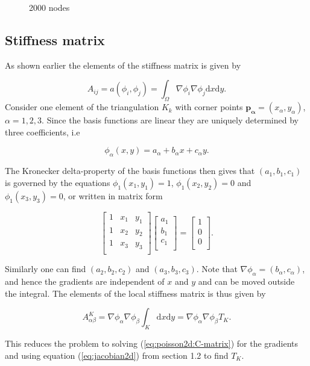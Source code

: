 \documentclass[paper=a4, fontsize=11pt]{scrartcl} %
\begin{document}
\begin{figure}[!htb]
  \caption{2000 nodes}\label{fig:2d2000}
\endminipage
\end{figure}

\subsection{Stiffness matrix}
As shown earlier the elements of the stiffness matrix is given by

\[ A_{ij} = a(\phi_i,\phi_j)=\int_{\Omega} \nabla \phi_i \nabla \phi_j \mathrm{d}x\mathrm{d}y.\] 
Consider one element of the triangulation $K_k$ with corner points $\mathbf{p_\alpha}=(x_\alpha,y_\alpha)$, $\alpha=1,2,3$. Since the basis functions are linear they are uniquely determined by three coefficients, i.e

\[\phi_\alpha(x,y) = a_\alpha +b_\alpha x+c_\alpha y.\]

The Kronecker delta-property of the basis functions then gives that $(a_1, b_1,c_1)$ is governed by the equations $\phi_1(x_1,y_1)=1$, $\phi_1(x_2,y_2)=0$ and $\phi_1(x_3,y_3)=0$, or written in matrix form

\begin{equation}
\begin{bmatrix}
  1 & x_1 & y_1\\
  1 & x_2 & y_2\\
  1 & x_3 & y_3\\\end{bmatrix}
\begin{bmatrix} a_1 \\ b_1\\ c_1 \\ \end{bmatrix} =
\begin{bmatrix}
  1 \\ 0\\ 0 \\
\end{bmatrix}.
\label{eq:poisson2d:C-matrix}
\end{equation}

Similarly one can find $(a_2, b_2,c_2)$ and $(a_3, b_3,c_3)$. Note that $\nabla \phi_\alpha=(b_\alpha,c_\alpha)$, and hence the gradients are independent of $x$ and $y$ and can be moved outside the integral. The elements of the local stiffness matrix is thus given by

\[ A^K_{\alpha\beta} =\nabla \phi_\alpha \nabla \phi_\beta \int_{K} \mathrm{d}x\mathrm{d}y = \nabla \phi_\alpha \nabla \phi_\beta T_K.\]

This reduces the problem to solving (\ref{eq:poisson2d:C-matrix}) for the gradients and using equation (\ref{eq:jacobian2d}) from section 1.2 to find $T_K$.
\end{document}
